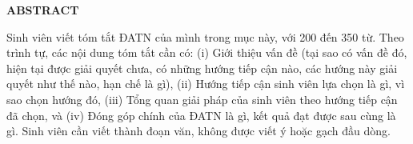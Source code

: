 \documentclass[../DoAn.tex]{subfiles}
\begin{document}
\begin{center}
    \Large{\textbf{ABSTRACT}}\\
\end{center}
\vspace{1cm}
Sinh viên viết tóm tắt ĐATN của mình trong mục này, với 200 đến 350 từ. Theo trình tự, các nội dung tóm tắt cần có: (i) Giới thiệu vấn đề (tại sao có vấn đề đó, hiện tại được giải quyết chưa, có những hướng tiếp cận nào, các hướng này giải quyết như thế nào, hạn chế là gì), (ii) Hướng tiếp cận sinh viên lựa chọn là gì, vì sao chọn hướng đó, (iii) Tổng quan giải pháp của sinh viên theo hướng tiếp cận đã chọn, và (iv) Đóng góp chính của ĐATN là gì, kết quả đạt được sau cùng là gì. Sinh viên cần viết thành đoạn văn, không được viết ý hoặc gạch đầu dòng.
\end{document}

